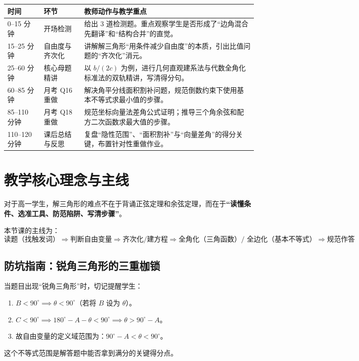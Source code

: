 \documentclass[11pt,a4paper]{ctexart}
\begin{document}
\begin{tabularx}{\textwidth}{p{2.6cm}p{3.2cm}X}
\toprule
时间 & 环节 & 教师动作与教学重点 \\
\midrule
0--15 分钟 & 开场检测 & 给出 3 道检测题。重点观察学生是否形成了“边角混合先翻译”和“结构合并”的直觉。 \\ \hline
15--25 分钟 & 自由度与齐次化 & 讲解解三角形“用条件减少自由度”的本质，引出比值问题的“齐次化”消元。 \\ \hline
25--60 分钟 & 核心母题精讲 & 以 $b/(2c)$ 为例，进行几何直观建系法与代数全角化标准法的双轨精讲，写清得分句。 \\ \hline
60--85 分钟 & 月考 Q16 重做 & 解决角平分线面积割补问题，规范倒数约束下使用基本不等式求最小值的步骤。 \\ \hline
85--110 分钟 & 月考 Q18 重做 & 规范坐标向量法差角公式证明；推导三个角余弦和配方二次函数求最大值的步骤。 \\ \hline
110--120 分钟 & 课后总结与反思 & 复盘“隐性范围”、“面积割补”与“向量差角”的得分关键，布置针对性重做作业。 \\
\bottomrule
\end{tabularx}

\section{教学核心理念与主线}

对于高一学生，解三角形的难点不在于背诵正弦定理和余弦定理，而在于\textbf{“读懂条件、选准工具、防范陷阱、写清步骤”}。

本节课的主线为：
\[
  \boxed{
  \text{读题（找触发词）}
  \Rightarrow
  \text{判断自由变量}
  \Rightarrow
  \text{齐次化/建方程}
  \Rightarrow
  \text{全角化（三角函数）/ 全边化（基本不等式）}
  \Rightarrow
  \text{规范作答}
  }
\]

\subsection{防坑指南：锐角三角形的三重枷锁}
当题目出现“锐角三角形”时，切记提醒学生：
\begin{enumerate}
  \item $B < 90^\circ \implies \theta < 90^\circ$（若将 $B$ 设为 $\theta$）。
  \item $C < 90^\circ \implies 180^\circ - A - \theta < 90^\circ \implies \theta > 90^\circ - A$。
  \item 故自由变量的定义域范围为：$\boxed{90^\circ - A < \theta < 90^\circ}$。
\end{enumerate}
这个不等式范围是解答题中能否拿到满分的关键得分点。
\end{document}
